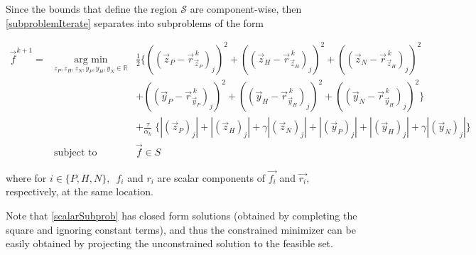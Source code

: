 \documentclass{article}
\def\R{\mathbb{R}} %
\newcommand{\zP}{\vec{z}_P }
\newcommand{\zH}{\vec{z}_H }
\newcommand{\zN}{\vec{z}_N }
\newcommand{\yP}{\vec{y}_P }
\newcommand{\yH}{\vec{y}_H }
\newcommand{\yN}{\vec{y}_N }
\begin{document}
Since the bounds that define the region $\mathcal{S}$ are component-wise, then  \ref{subproblemIterate} separates into subproblems of the form

\renewcommand{\arraystretch}{1}
\begin{equation} \label{scalarSubprob}
	\begin{aligned}
		\vec{f}^{k+1} = & \underset{ z_P,z_H,z_N,y_P,y_H,y_N \in \R}{\text{arg min}}
		&  \frac{1}{2} \Big\{
		((\zP - \vec{r}_{\zP}^{\, k})_j)^2 + 
		((\zH - \vec{r}_{\zH}^{\, k})_j)^2 +
		((\zN - \vec{r}_{\zH}^{\, k})_j)^2 \\ & & + 
		((\yP - \vec{r}_{\yP}^{\, k})_j)^2 + 
		((\yH - \vec{r}_{\yH}^{\, k})_j)^2 +
		((\yN - \vec{r}_{\yH}^{\, k})_j)^2 \Big\} \\ & & +
		\frac{\tau}{\alpha_k} \; \Big\{ 
		|(\zP)_j| + |(\zH)_j| + \gamma |(\zN)_j|  +
		|(\yP)_j| + |(\yH)_j| + \gamma |(\yN)_j|\Big\} \\
		& \text{subject to} &  \vec{f} \in S
	\end{aligned}
\end{equation}

where for $i \in \{P,H,N\},\,$ $f_i$ and $r_i$  are scalar components of $\vec{f_i}$ and $\vec{r_i}$, respectively, at the same location.  

Note that \ref{scalarSubprob} has closed form solutions (obtained by completing the square and ignoring constant terms), and thus the constrained minimizer can be easily obtained by projecting the unconstrained solution to the feasible set. 





\end{document}
